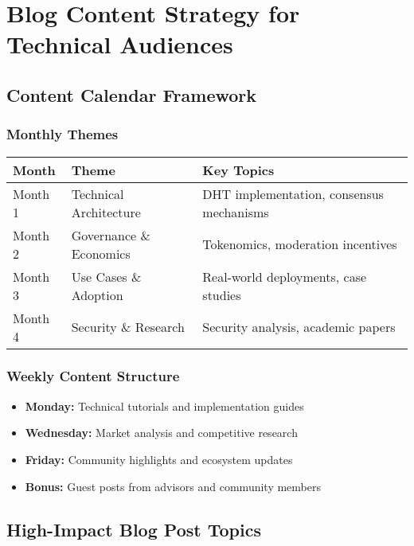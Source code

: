 \documentclass[12pt,a4paper]{article}
\begin{document}
\section{Blog Content Strategy for Technical Audiences}

\subsection{Content Calendar Framework}

\subsubsection{Monthly Themes}
\begin{center}
\begin{tabular}{|l|l|p{6cm}|}
\hline
\textbf{Month} & \textbf{Theme} & \textbf{Key Topics} \\
\hline
Month 1 & Technical Architecture & DHT implementation, consensus mechanisms \\
\hline
Month 2 & Governance \& Economics & Tokenomics, moderation incentives \\
\hline
Month 3 & Use Cases \& Adoption & Real-world deployments, case studies \\
\hline
Month 4 & Security \& Research & Security analysis, academic papers \\
\hline
\end{tabular}
\end{center}

\subsubsection{Weekly Content Structure}
\begin{itemize}
    \item \textbf{Monday:} Technical tutorials and implementation guides
    \item \textbf{Wednesday:} Market analysis and competitive research  
    \item \textbf{Friday:} Community highlights and ecosystem updates
    \item \textbf{Bonus:} Guest posts from advisors and community members
\end{itemize}

\subsection{High-Impact Blog Post Topics}
\end{document}
